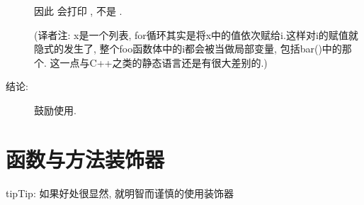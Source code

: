 \documentclass[a4paper,10pt,english]{sphinxmanual}
\begin{document}
\begin{description}
因此  会打印  , 不是  .

(译者注: x是一个列表, for循环其实是将x中的值依次赋给i.这样对i的赋值就隐式的发生了, 整个foo函数体中的i都会被当做局部变量, 包括bar()中的那个. 这一点与C++之类的静态语言还是有很大差别的.)

\item[{结论:}] \leavevmode
鼓励使用.

\end{description}


\section{函数与方法装饰器}
\label{\detokenize{python_language_rules:id12}}
\begin{sphinxadmonition}{tip}{Tip:}
如果好处很显然, 就明智而谨慎的使用装饰器
\end{sphinxadmonition}
\end{document}
